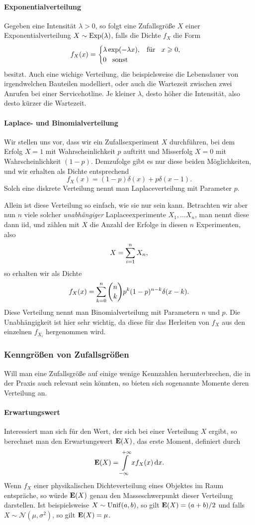 \paragraph{Exponentialverteilung}
Gegeben eine Intensität $\lambda > 0$, so folgt eine Zufallsgröße $X$ einer Exponentialverteilung $X \sim \operatorname*{Exp}(\lambda)$, falls die Dichte $f_X$ die Form 
\[
f_X(x) = \begin{cases}
    \lambda \exp(-\lambda x), {\hspace{3mm} \text{für} \hspace{3mm}} x \geqslant
    0, \\
    0 {\hspace{3mm} \text{sonst} \hspace{3mm}}
\end{cases}
\]
besitzt.
Auch eine wichige Verteilung, die beispielsweise die Lebensdauer von irgendwelchen Bauteilen modelliert, oder auch die Wartezeit zwischen zwei Anrufen bei einer Servicehotline. 
Je kleiner $\lambda$, desto höher die Intensität, also desto kürzer die Wartezeit.
%
%
\paragraph{Laplace- und Binomialverteilung}
%
Wir stellen uns vor, dass wir ein Zufallsexperiment $X$ durchführen, bei dem Erfolg $X=1$ mit Wahrscheinlichkeit $p$ auftritt und Misserfolg $X=0$ mit Wahrscheinlichkeit $(1-p)$.
Demzufolge gibt es nur diese beiden Möglichkeiten, und wir erhalten als Dichte entsprechend
\[
f_{X}(x) = (1-p) \delta(x) + p \delta(x-1). 
\]
Solch eine diskrete Verteilung nennt man Laplaceverteilung mit Parameter $p$.

Allein ist diese Verteilung so einfach, wie sie nur sein kann.
Betrachten wir aber nun $n$ viele solcher \emph{unabhängiger} Laplaceexperimente $X_1, \ldots X_n$, man nennt diese dann \gls{iid}, und zählen mit $X$ die Anzahl der Erfolge in diesen $n$ Experimenten, also 
\[
    X = {\sum\limits_{i = 1}^{n}{X_n}},
\]
so erhalten wir als Dichte
\[
    f_{X}(x) = {\sum\limits_{k = 0}^{n}{\binom{n}{k} p^k (1-p)^{n-k} \delta(x - k)}}.
\]
Diese Verteilung nennt man Binomialverteilung mit Parametern $n$ und $p$.
Die Unabhängigkeit ist hier sehr wichtig, da diese für das Herleiten von $f_X$ aus den einzelnen $f_{X_i}$ hergenommen wird.
%
%
%
%
%
\subsubsection{Kenngrößen von Zufallsgrößen}
%
Will man eine Zufallsgröße auf einige wenige Kennzahlen herunterbrechen, die in der Praxis auch relevant sein könnten, so bieten sich sogenannte Momente deren Verteilung an.
%
%
\paragraph{Erwartungswert}
Interessiert man sich für den Wert, der sich  bei einer Verteilung $X$ ergibt, so berechnet man den Erwartungswert $\bm{\mathrm{E}}(X)$, das erste Moment, definiert durch
\begin{equation}\label{eq:random:mean}
    \bm{\mathrm{E}}(X) = {\int\limits_{-\infty}^{+\infty}{x f_X(x)}\,\mathrm{d}{x}}.
\end{equation}
Wenn $f_X$ einer physikalischen Dichteverteilung eines Objektes im Raum entspräche, so würde $\bm{\mathrm{E}}(X)$ genau den Masseschwerpunkt dieser Verteilung darstellen.
Ist beispielsweise $X \sim \operatorname{Unif}(a,b)$, so gilt $\bm{\mathrm{E}}(X) = (a+b)/2$ und falls $X \sim \mathcal{N}(\mu, \sigma^2)$, so gilt $\bm{\mathrm{E}}(X) = \mu$.

